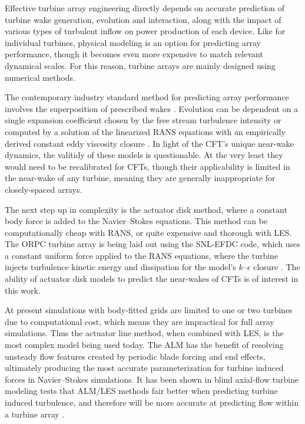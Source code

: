 Effective turbine array engineering directly depends on accurate prediction of
turbine wake generation, evolution and interaction, along with the impact of
various types of turbulent inflow on power production of each device. Like for
individual turbines, physical modeling is an option for predicting array
performance, though it becomes even more expensive to match relevant dynamical
scales. For this reason, turbine arrays are mainly designed using numerical
methods.

The contemporary industry standard method for predicting array performance
involves the superposition of prescribed wakes \cite{Stevens2014b}. Evolution
can be dependent on a single expansion coefficient chosen by the free stream
turbulence intensity \cite{Jensen1983, Choi2013} or computed by a solution of
the linearized RANS equations with an empirically derived constant eddy
viscosity closure \cite{Ainslie1988}. In light of the CFT's unique near-wake
dynamics, the valitidy of these models is questionable. At the very least they
would need to be recalibrated for CFTs, though their applicability is limited in
the near-wake of any turbine, meaning they are generally inappropriate for
closely-spaced arrays.
	
The next step up in complexity is the actuator disk method, where a constant
body force is added to the Navier--Stokes equations. This method can be
computationally cheap with RANS, or quite expensive and thorough with LES. The
ORPC turbine array is being laid out using the SNL-EFDC code, which uses a
constant uniform force applied to the RANS equations, where the turbine injects
turbulence kinetic energy and dissipation for the model's $k$--$\epsilon$
closure \cite{Nelson2013}. The ability of actuator disk models to predict the
near-wakes of CFTs is of interest in this work.
	
At present simulations with body-fitted grids are limited to one or two turbines
due to computational cost, which means they are impractical for full array
simulations. Thus the actuator line method, when combined with LES, is the most
complex model being used today. The ALM has the benefit of resolving unsteady
flow features created by periodic blade forcing and end effects, ultimately
producing the most accurate parameterization for turbine induced forces in
Navier--Stokes simulations. It has been shown in blind axial-flow turbine
modeling tests that ALM/LES methods fair better when predicting turbine induced
turbulence, and therefore will be more accurate at predicting flow within a
turbine array \cite{Krogstad2013}.


